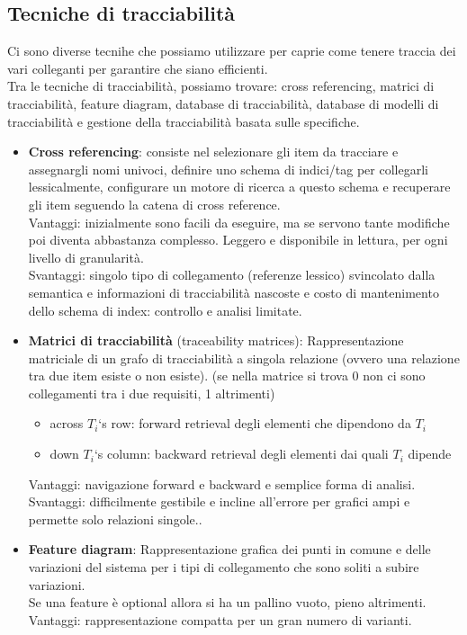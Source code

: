 \subsection{Tecniche di tracciabilità}
Ci sono diverse tecnihe che possiamo utilizzare per caprie come tenere traccia dei vari colleganti per garantire che siano efficienti. \\
Tra le tecniche di tracciabilità, possiamo trovare: cross referencing, matrici di tracciabilità, feature diagram, database di tracciabilità, database di modelli di tracciabilità e gestione della tracciabilità basata sulle specifiche.
\begin{itemize}
    \item \textbf{Cross referencing}: consiste nel selezionare gli item da tracciare e assegnargli nomi univoci, definire uno schema di indici/tag per collegarli lessicalmente, configurare un motore di ricerca a questo schema e recuperare gli item seguendo la catena di cross reference.\\
    Vantaggi: inizialmente sono facili da eseguire, ma se servono tante modifiche poi diventa abbastanza complesso. Leggero e disponibile in lettura, per ogni livello di granularità.\\
    Svantaggi: singolo tipo di collegamento (referenze lessico) svincolato dalla semantica e informazioni di tracciabilità nascoste e costo di mantenimento dello schema di index: controllo e analisi limitate.
    \item \textbf{Matrici di tracciabilità} (traceability matrices): Rappresentazione matriciale di un grafo di tracciabilità a singola relazione (ovvero una relazione tra due item esiste o non esiste). (se nella matrice si trova 0 non ci sono collegamenti tra i due requisiti, 1 altrimenti)\\
    \begin{itemize}
        \item across $T_i$‘s row: forward retrieval degli elementi che dipendono da $T_i$
        \item down $T_i$‘s column: backward retrieval degli elementi dai quali $T_i$ dipende
    \end{itemize}
    Vantaggi: navigazione forward e backward e semplice forma di analisi.
    Svantaggi: difficilmente gestibile e incline all’errore per grafici ampi e permette solo relazioni singole..
    \item \textbf{Feature diagram}: Rappresentazione grafica dei punti in comune e delle variazioni del sistema per i tipi di collegamento che sono soliti a subire variazioni.\\ Se una feature è optional allora si ha un pallino vuoto, pieno altrimenti.
    Vantaggi: rappresentazione compatta per un gran numero di varianti.
\end{itemize}